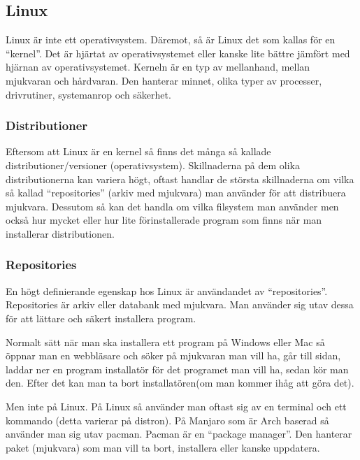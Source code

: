\documentclass[12pt, a4paper]{report}
\begin{document}
    \subsection{Linux}
 
   Linux är inte ett operativsystem. Däremot, så är Linux det som kallas för en ``kernel''\cite{redhat}. Det är hjärtat av operativsystemet eller kanske lite bättre jämfört med hjärnan av operativsystemet. Kerneln är en typ av mellanhand, mellan mjukvaran och hårdvaran. Den hanterar minnet, olika typer av processer, drivrutiner, systemanrop och säkerhet\cite{redhat}.
 

    \subsubsection{Distributioner}

   Eftersom att Linux är en kernel så finns det många så kallade distributioner/versioner (operativsystem). Skillnaderna på dem olika distributionerna kan variera högt, oftast handlar de största skillnaderna om vilka så kallad ``repositories'' (arkiv med mjukvara) man använder för att distribuera mjukvara. Dessutom så kan det handla om vilka filsystem man använder men också hur mycket eller hur lite förinstallerade program som finns när man installerar distributionen.

   \subsubsection{Repositories}

    En högt definierande egenskap hos Linux är användandet av ``repositories''. Repositories är arkiv eller databank med mjukvara. Man använder sig utav dessa för att lättare och säkert installera program.

    Normalt sätt när man ska installera ett program på Windows eller Mac så öppnar man en webbläsare och söker på mjukvaran man vill ha, går till sidan, laddar ner en program installatör för det programet man vill ha, sedan kör man den. Efter det kan man ta bort installatören(om man kommer ihåg att göra det).
    
    Men inte på Linux. På Linux så använder man oftast sig av en terminal och ett kommando (detta varierar på distron).
    På Manjaro som är Arch baserad så använder man sig utav pacman\cite{pacman}. Pacman är en ``package manager''\cite{pkgmanager}. Den hanterar paket (mjukvara) som man vill ta bort, installera eller kanske uppdatera.
\end{document}
